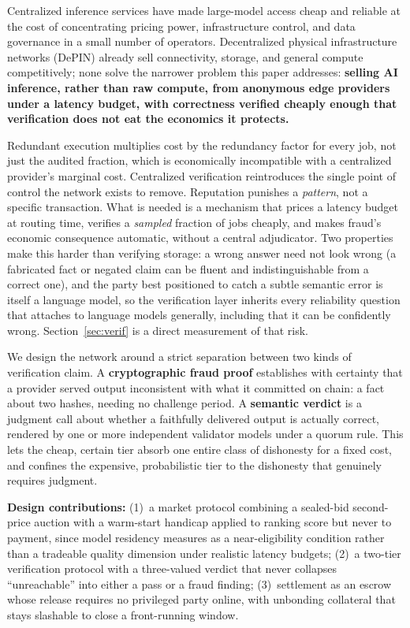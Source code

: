 \documentclass[conference]{IEEEtran}
\begin{document}
Centralized inference services have made large-model access cheap and reliable at the cost of
concentrating pricing power, infrastructure control, and data governance in a small number of
operators. Decentralized physical infrastructure networks (DePIN) already sell connectivity,
storage, and general compute competitively; none solve the narrower problem this paper addresses:
\textbf{selling AI inference, rather than raw compute, from anonymous edge providers under a
latency budget, with correctness verified cheaply enough that verification does not eat the
economics it protects.}

Redundant execution multiplies cost by the redundancy factor for every job, not just the audited
fraction, which is economically incompatible with a centralized provider's marginal cost.
Centralized verification reintroduces the single point of control the network exists to remove.
Reputation punishes a \emph{pattern}, not a specific transaction. What is needed is a mechanism
that prices a latency budget at routing time, verifies a \emph{sampled} fraction of jobs cheaply,
and makes fraud's economic consequence automatic, without a central adjudicator. Two properties
make this harder than verifying storage: a wrong answer need not look wrong (a fabricated fact or
negated claim can be fluent and indistinguishable from a correct one), and the party best
positioned to catch a subtle semantic error is itself a language model, so the verification layer
inherits every reliability question that attaches to language models generally, including that it
can be confidently wrong. Section~\ref{sec:verif} is a direct measurement of that risk.

We design the network around a strict separation between two kinds of verification claim. A
\textbf{cryptographic fraud proof} establishes with certainty that a provider served output
inconsistent with what it committed on chain: a fact about two hashes, needing no challenge
period. A \textbf{semantic verdict} is a judgment call about whether a faithfully delivered output
is actually correct, rendered by one or more independent validator models under a quorum rule.
This lets the cheap, certain tier absorb one entire class of dishonesty for a fixed cost, and
confines the expensive, probabilistic tier to the dishonesty that genuinely requires judgment.

\textbf{Design contributions:} (1)~a market protocol combining a sealed-bid second-price auction
with a warm-start handicap applied to ranking score but never to payment, since model residency
measures as a near-eligibility condition rather than a tradeable quality dimension under realistic
latency budgets; (2)~a two-tier verification protocol with a three-valued verdict that never
collapses ``unreachable'' into either a pass or a fraud finding; (3)~settlement as an escrow whose
release requires no privileged party online, with unbonding collateral that stays slashable to
close a front-running window.
\end{document}
